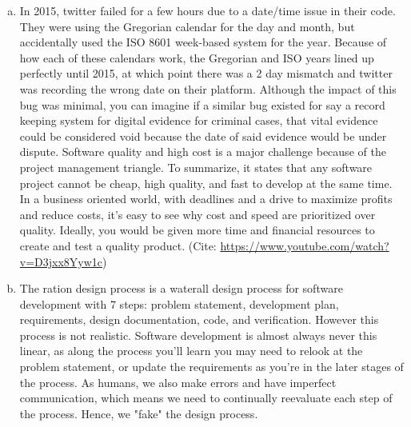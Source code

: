 \documentclass[12pt]{article}
\begin{document}
\begin{enumerate}[(a)]
\item In 2015, twitter failed for a few hours due to a date/time issue in their code. They were using the Gregorian calendar for the day and month, but accidentally used the ISO 8601 week-based system for the year. Because of how each of these calendars work, the Gregorian and ISO years lined up perfectly until 2015, at which point there was a 2 day mismatch and twitter was recording the wrong date on their platform. Although the impact of this bug was minimal, you can imagine if a similar bug existed for say a record keeping system for digital evidence for criminal cases, that vital evidence could be considered void because the date of said evidence would be under dispute. Software quality and high cost is a major challenge because of the project management triangle. To summarize, it states that any software project cannot be cheap, high quality, and fast to develop at the same time. In a business oriented world, with deadlines and a drive to maximize profits and reduce costs, it's easy to see why cost and speed are prioritized over quality. Ideally, you would be given more time and financial resources to create and test a quality product. (Cite: \url{https://www.youtube.com/watch?v=D3jxx8Yyw1c})

\item The ration design process is a waterall design process for software development with 7 steps: problem statement, development plan, requirements, design documentation, code, and verification. However this process is not realistic. Software development is almost always never this linear, as along the process you'll learn you may need to relook at the problem statement, or update the requirements as you're in the later stages of the process. As humans, we also make errors and have imperfect communication, which means we need to continually reevaluate each step of the process. Hence, we "fake" the design process. 


\end{enumerate}
\end{document}
